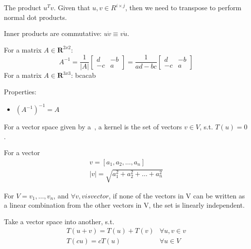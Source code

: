\begin{definition}\label{innerprod}
    The product $u^{T}v$. Given that $u, v \in R^{i\times{j}}$, then we need to transpose
    to perform normal dot products.

    Inner products are commutative: $u \dot v \equiv v \dot u$.
\end{definition}

\begin{definition}[Inverse]
    For a matrix $A \in \mathbf{R}^{2x2}$:
    $$
    A^{-1} = \frac{1}{|A|}
    \begin{bmatrix}
    d & -b \\
    -c & a
    \end{bmatrix}
    = \frac{1}{ad - bc}
    \begin{bmatrix}
    d & -b \\
    -c & a
    \end{bmatrix}
    $$
    For a matrix $A \in \mathbf{R}^{3x3}$: bcacab

    Properties:
    \begin{itemize}
    \item $(A^{-1})^{-1} = A$
    \end{itemize}
\end{definition}

\begin{definition}[Kernel]
    For a vector space given by a~, a kernel is the set
    of vectors $v \in V$, s.t. $T(u) = 0$.
\end{definition}

\begin{definition}\label{vectorlength}
    For a vector 
    \begin{align*}
        v = [a_{1}, a_{2}, \dots , a_{n}] \\
        |v| = \sqrt{a^{2}_{1} + a^{2}_{2} + \dots + a^{2}_{n}}{}
    \end{align*}
\end{definition}

\begin{definition}
    For $V = {v_{1}, \dots, v_{n}}$, and $\forall v, v is vector$,
    if none of the vectors in V can be written as a linear combination
    from the other vectors in V, the set is linearly independent.
\end{definition}

\begin{definition}\label{lintrans}
    Take a vector space into another, s.t.\
    \begin{align}
        T(u + v) = T(u) + T(v) &\forall u,v \in v \\
        T(cu) = cT(u) &\forall u \in V
    \end{align}
\end{definition}

